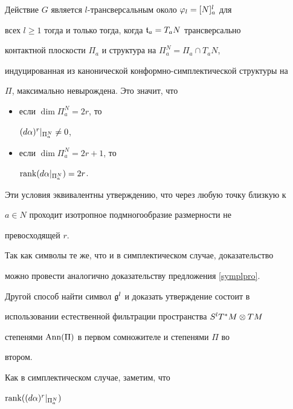 \begin{prop}


Действие $G$ является $l$-трансверсальным около $\varphi_l=[N]_a^l$ для


всех $l\ge1$ тогда и только тогда, когда ${\frak t}_a=T_aN$ трансверсально


контактной плоскости $\Pi_a$ и структура на $\Pi_a^N=\Pi_a\cap T_aN$,


индуцированная из канонической конформно-симплектической структуры на


$\Pi$, максимально невырождена. Это значит, что


\begin{itemize}


\item[---] если $\dim\Pi^N_a=2r$, то


$(d\alpha)^r|_{\Pi^N_a}\ne0$,


\item[---] если $\dim\Pi^N_a=2r+1$, то


$\operatorname{rank}(d\alpha|_{\Pi^N_a})=2r$.


\end{itemize}





Эти условия эквивалентны утверждению, что через любую точку близкую к


$a\in N$ проходит изотропное подмногообразие размерности не


превосходящей $r$.


\end{prop}





Так как символы те же, что и в симплектическом случае, доказательство


можно провести аналогично доказательству предложения \ref{symplpro}.


Другой способ найти символ ${\frak g}^l$ и доказать утверждение состоит в


использовании естественной фильтрации пространства $S^lT^*M\otimes TM$


степенями $\operatorname{Ann}(\Pi)$ в первом сомножителе и степенями $\Pi$ во


втором.







Как в симплектическом случае, заметим, что


$\operatorname{rank}((d\alpha)^r|_{\Pi^N_a})$



